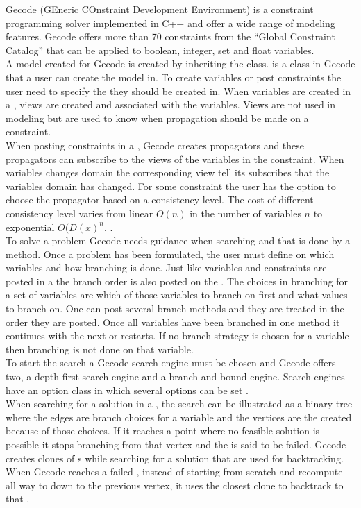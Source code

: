 Gecode (GEneric COnstraint Development Environment) is a constraint programming solver implemented in C++ and 
offer a wide range of modeling features. Gecode offers more than 70 constraints from the ``Global Constraint Catalog'' 
\cite{url_globalCons} that can be applied to boolean, integer, set and float variables.  \\ 
A model created for Gecode is created by inheriting the  class.  is a class in Gecode that 
a user can create the model in. To create variables or post constraints the user need to specify the  they 
should be created in. When variables are created in a , views are created and associated with the 
variables. Views are not used in modeling but are used to know when propagation should be made on a constraint. \\ 
When posting constraints in a , Gecode creates propagators and these propagators can subscribe to the views 
of the variables in the constraint. When variables changes domain the corresponding view tell its subscribes that the 
variables domain has changed. For some constraint the user has the option to choose the propagator based on a 
consistency level. The cost of different consistency level varies from linear $O(n)$ in the number of variables $n$ to 
exponential $O(D(x)^n$. \cite[p.57]{MPG:M}. \\
To solve a problem Gecode needs guidance when searching and that is done by a  method. Once a problem 
has been formulated, the user must define on which variables and how branching is done. Just like variables and 
constraints are 
posted in a  the branch order is also posted on the . The choices in branching for a set of 
variables are 
which of those variables to branch on first and what values to branch on. One can post several branch methods and they 
are treated in the order they are posted. Once all variables have been branched in one  method it 
continues with the next  or restarts.  If no branch strategy is chosen for a variable then branching is 
not done on that variable. \\ 
To start the search a Gecode search engine must be chosen and Gecode offers two, a depth first search engine and a 
branch and bound engine. Search engines have an option class in which several options can be set \cite[p.157]{MPG:M}. 
\\ 
When searching for a solution in a , the search can be illustrated as a binary tree where the edges are 
branch choices for a variable and the vertices are the  created because of those choices. If it reaches a 
point 
where no feasible solution is possible it stops branching from that vertex and the  is said to be failed. 
Gecode creates clones of s while searching for a solution that are used for backtracking. When Gecode 
reaches a failed , instead of starting from scratch and recompute all way to down to the previous vertex, 
it 
uses the closest clone to backtrack to that . \\